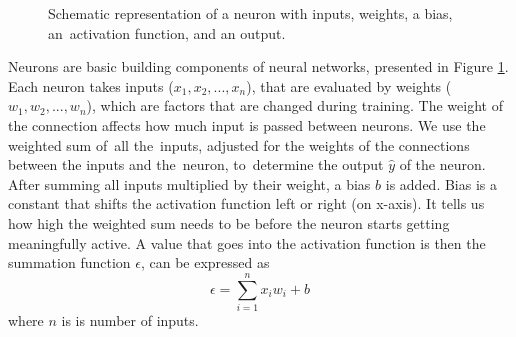 \begin{figure}[htp]
	\centering
	
	\caption{Schematic representation of a neuron with inputs, weights, a bias, an~activation function, and an output.}
	\label{fig:neuron}
\end{figure}


Neurons are basic building components of neural networks, presented in Figure \ref{fig:neuron}. Each neuron takes inputs ($x_1, x_2, ..., x_n$), that are evaluated by weights ($w_1, w_2, ..., w_n$), which are factors that are changed during training. The weight of the connection affects how much input is passed between neurons. We use the weighted sum of~all the~inputs, adjusted for the weights of the connections between the inputs and the~neuron, to~determine the output $\hat{y}$ of the neuron. After summing all inputs multiplied by their weight, a bias $b$ is added. Bias is a constant that shifts the activation function left or right (on x-axis). It tells us how high the weighted sum needs to be before the neuron starts getting meaningfully active. A value that goes into the activation function is then the summation function $\epsilon$, can be expressed as
\begin{equation}
	\epsilon = \sum_{i=1}^{n} x_i w_i + b
	\label{eq:weighted_sum}
\end{equation}
where $n$ is is number of inputs.


